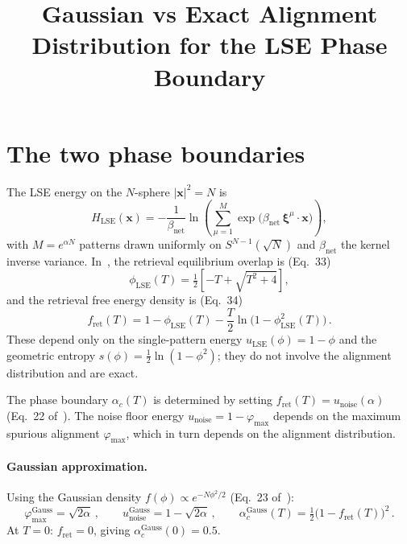 \documentclass[11pt]{article}
\title{Gaussian vs Exact Alignment Distribution for the LSE Phase Boundary}
\author{}
\date{}
\newcommand{\bxi}{\boldsymbol{\xi}}
\newcommand{\bx}{\mathbf{x}}
\begin{document}
\maketitle

\section{The two phase boundaries}

The LSE energy on the $N$-sphere $|\bx|^2 = N$ is
\begin{equation}
H_{\mathrm{LSE}}(\bx) = -\frac{1}{\beta_{\mathrm{net}}}\ln\left(\sum_{\mu=1}^{M}\exp\!\big(\beta_{\mathrm{net}}\,\bxi^\mu\!\cdot\!\bx\big)\right),
\label{eq:lse}
\end{equation}
with $M = e^{\alpha N}$ patterns drawn uniformly on $S^{N-1}(\!\sqrt{N})$ and $\beta_{\mathrm{net}}$ the kernel inverse variance.  In~\citep{icml2026theory}, the retrieval equilibrium overlap is (Eq.~33)
\begin{equation}
\phi_{\mathrm{LSE}}(T) = \tfrac{1}{2}\!\left[-T + \sqrt{T^2 + 4}\right],
\label{eq:phi_eq}
\end{equation}
and the retrieval free energy density is (Eq.~34)
\begin{equation}
f_{\mathrm{ret}}(T) = 1 - \phi_{\mathrm{LSE}}(T) - \frac{T}{2}\ln\!\big(1-\phi_{\mathrm{LSE}}^2(T)\big)\,.
\label{eq:f_ret}
\end{equation}
These depend only on the single-pattern energy $u_{\mathrm{LSE}}(\phi) = 1-\phi$ and the geometric entropy $s(\phi) = \tfrac{1}{2}\ln(1-\phi^2)$; they do not involve the alignment distribution and are exact.

The phase boundary $\alpha_c(T)$ is determined by setting $f_{\mathrm{ret}}(T) = u_{\mathrm{noise}}(\alpha)$ (Eq.~22 of~\citep{icml2026theory}).  The noise floor energy $u_{\mathrm{noise}} = 1 - \varphi_{\max}$ depends on the maximum spurious alignment $\varphi_{\max}$, which in turn depends on the alignment distribution.

\paragraph{Gaussian approximation.}
Using the Gaussian density $f(\phi) \propto e^{-N\phi^2/2}$ (Eq.~23 of~\citep{icml2026theory}):
\begin{equation}
\varphi_{\max}^{\mathrm{Gauss}} = \sqrt{2\alpha}\,,\qquad
u_{\mathrm{noise}}^{\mathrm{Gauss}} = 1 - \sqrt{2\alpha}\,,\qquad
\alpha_c^{\mathrm{Gauss}}(T) = \tfrac{1}{2}\!\big(1 - f_{\mathrm{ret}}(T)\big)^2\,.
\label{eq:gauss}
\end{equation}
At $T = 0$: $f_{\mathrm{ret}} = 0$, giving $\alpha_c^{\mathrm{Gauss}}(0) = 0.5$.
\end{document}
